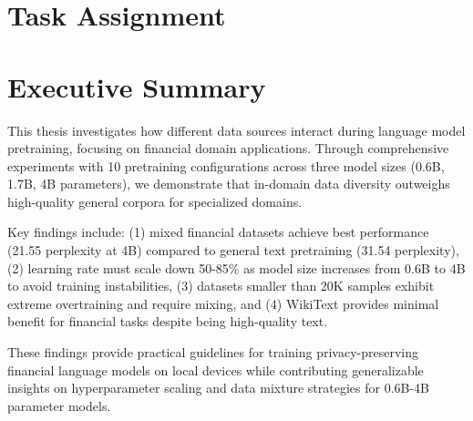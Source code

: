 \documentclass[11pt,a4paper,english,oneside]{book}
\begin{document}
\thispagestyle{empty}
\titleGP

\newpage

\setcounter{page}{1}

\section*{Task Assignment}
\thispagestyle{firststyle}
\newpage

\section*{Executive Summary}
\thispagestyle{firststyle}

This thesis investigates how different data sources interact during language model pretraining, focusing on financial domain applications. Through comprehensive experiments with 10 pretraining configurations across three model sizes (0.6B, 1.7B, 4B parameters), we demonstrate that in-domain data diversity outweighs high-quality general corpora for specialized domains.

Key findings include: (1) mixed financial datasets achieve best performance (21.55 perplexity at 4B) compared to general text pretraining (31.54 perplexity), (2) learning rate must scale down 50-85\% as model size increases from 0.6B to 4B to avoid training instabilities, (3) datasets smaller than 20K samples exhibit extreme overtraining and require mixing, and (4) WikiText provides minimal benefit for financial tasks despite being high-quality text.

These findings provide practical guidelines for training privacy-preserving financial language models on local devices while contributing generalizable insights on hyperparameter scaling and data mixture strategies for 0.6B-4B parameter models.

\newpage

\tableofcontents
\listoffigures
\listoftables
\end{document}

